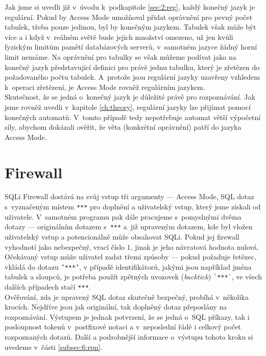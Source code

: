 Jak jsme si uvedli již v~úvodu k~podkapitole \ref{sec:2:reg}, každý konečný jazyk je regulární. Pokud by Access Mode umožňoval přidat oprávnění 
pro pevný počet tabulek, třeba pouze jedinou, byl by konečným jazykem. Tabulek však může být více a i když v~reálném světě bude jejich množství 
omezeno, už jen kvůli fyzickým limitům pamětí databázových serverů, v~samotném jazyce žádný horní limit nemáme. Na oprávnění pro tabulky se však 
můžeme podívat jako na konečný jazyk představující definici pro právě jednu tabulku, který je zřetězen do požadovaného počtu tabulek.
A~protože jsou regulární jazyky uzavřeny vzhledem k~operaci zřetězení, je Access Mode rovněž regulárním jazykem. \\

Skutečnost, že se jedná o~konečný jazyk je důležité právě pro rozpoznávání. Jak jsme rovněž uvedli v~kapitole \ref{ch:theory}, regulární jazyky lze 
přijímat pomocí konečných automatů. V~tomto případě tedy nepotřebuje automat větší výpočetní síly, abychom dokázali ověřit, že 
věta (konkrétní oprávnění) patří do jazyka Access Mode.

\section{Firewall} \label{sec:6:firewall}
SQLi Firewall dostává na svůj vstup tři argumenty --- Access Mode, SQL dotaz s~vyznačeným místem \texttt{***} pro doplnění a uživatelský vstup, který
jsme získali od uživatele. V~samotném programu pak dále pracujeme s~pomyslnými dvěma dotazy --- originálním dotazem s~\texttt{***} a~již 
upraveným dotazem, kde byl vložen uživatelský vstup a potencionálně může obsahovat SQLi. Pokud jej firewall vyhodnotí jako nebezpečný,
vrací číslo $1$, jinak je jeho návratová hodnota nulová. \\

Očekávaný vstup může uživatel zadat třemi způsoby --- pokud požaduje řetězec, vkládá do dotazu \texttt{'***'}, v případě identifikátorů,
jakými jsou například jména tabulek a sloupců, je potřeba použít zpětných uvozovek (\textit{backtick}) \texttt{\`{}***\`}, ve všech dalších 
případech stačí \texttt{***}. \\

Ověřování, zda je upravený SQL dotaz skutečně bezpečný, probíhá v~několika krocích. Nejdříve jsou jak originální, tak doplněný dotaz přeposlány
na rozpoznávání. Výstupem je jednak potvrzení, že se jedná o~SQL příkazy, tak i posloupnost tokenů v~postfixové notaci a v~neposlední řádě
i celkový počet rozpoznaných dotazů. Další a podrobnější informace o~výstupu tohoto kroku si uvedeme v~části \ref{subsec:6:rpn}.\\


